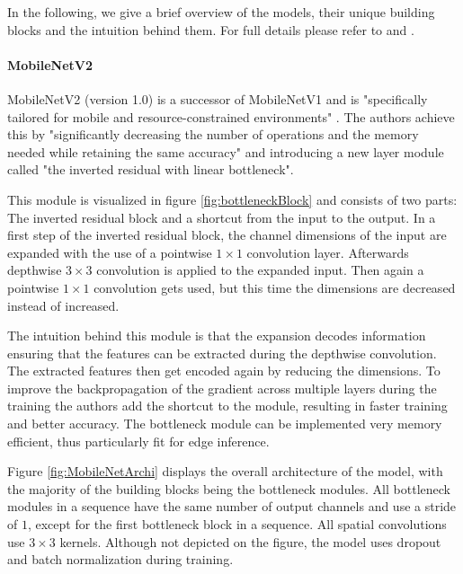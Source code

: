 In the following, we give a brief overview of the models, their unique building blocks and the intuition behind them.
For full details please refer to \cite{DBLP:journals/corr/abs-1801-04381} and \cite{InceptionV4}.

\paragraph{MobileNetV2}
MobileNetV2 (version 1.0) is a successor of MobileNetV1 and is "specifically tailored for mobile and resource-constrained environments" \cite{DBLP:journals/corr/abs-1801-04381}. The authors achieve this by "significantly decreasing the number of operations and the memory needed while retaining the same accuracy"  \cite{DBLP:journals/corr/abs-1801-04381} and introducing a new layer module called "the
inverted residual with linear bottleneck".

This module is visualized in figure \ref{fig:bottleneckBlock} and consists of two parts: The inverted residual block and a shortcut from the input to the output.
In a first step of the inverted residual block, the channel dimensions of the input are expanded with the use of a pointwise $1\times1$ convolution layer. 
Afterwards depthwise $3\times3$ convolution is applied to the expanded input. Then again a pointwise $1\times1$ convolution gets used, but this time the dimensions are decreased instead of increased.

The intuition behind this module is that the expansion decodes information ensuring that the features can be extracted during the depthwise convolution. The extracted features then get encoded again by reducing the dimensions.
To improve the backpropagation of the gradient across multiple layers during the training the authors add the shortcut to the module, resulting in faster training and better accuracy.
The bottleneck module can be implemented very memory efficient, thus particularly fit for edge inference.

Figure \ref{fig:MobileNetArchi} displays the overall architecture of the model, with the majority of the building blocks being the bottleneck modules.
All bottleneck modules in a sequence have the same number of output channels and use a stride of $1$, except for the first bottleneck block in a sequence. All spatial convolutions use $3\times3$ kernels. 
Although not depicted on the figure, the model uses dropout and batch normalization during training.

